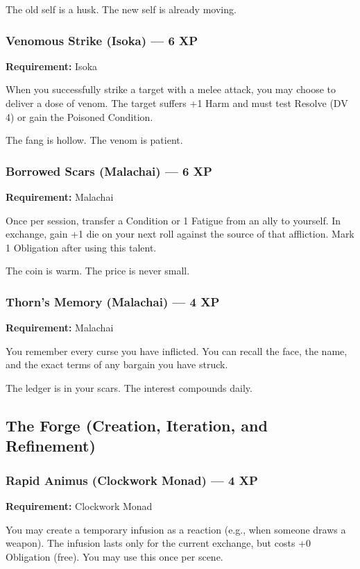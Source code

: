 The old self is a husk. The new self is already moving.

\subsubsection{Venomous Strike (Isoka) — 6 XP}

\textbf{Requirement:} Isoka

When you successfully strike a target with a melee attack, you may choose to deliver a dose of venom. The target suffers +1 Harm and must test Resolve (DV 4) or gain the Poisoned Condition.

The fang is hollow. The venom is patient.

\subsubsection{Borrowed Scars (Malachai) — 6 XP}

\textbf{Requirement:} Malachai

Once per session, transfer a Condition or 1 Fatigue from an ally to yourself. In exchange, gain +1 die on your next roll against the source of that affliction. Mark 1 Obligation after using this talent.

The coin is warm. The price is never small.

\subsubsection{Thorn's Memory (Malachai) — 4 XP}

\textbf{Requirement:} Malachai

You remember every curse you have inflicted. You can recall the face, the name, and the exact terms of any bargain you have struck.

The ledger is in your scars. The interest compounds daily.

\subsection{The Forge (Creation, Iteration, and Refinement)}

\subsubsection{Rapid Animus (Clockwork Monad) — 4 XP}

\textbf{Requirement:} Clockwork Monad

You may create a temporary infusion as a reaction (e.g., when someone draws a weapon). The infusion lasts only for the current exchange, but costs +0 Obligation (free). You may use this once per scene.

